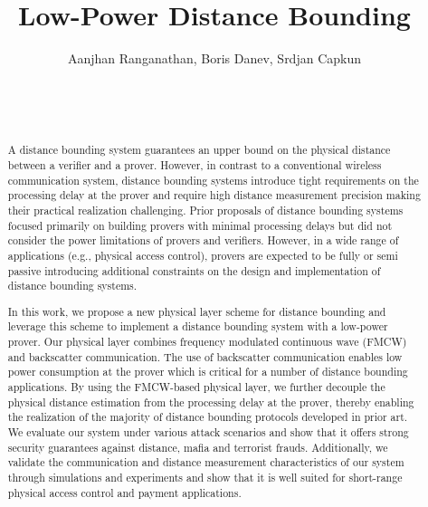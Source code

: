\documentclass{sig-alternate-10pt}
\begin{document}
\title{\Large \bf Low-Power Distance Bounding}
\date{}
\author{\alignauthor Aanjhan Ranganathan, Boris Danev, Srdjan Capkun\\
  \\
  \\
  \\
}

\maketitle

\begin{abstract}

  A distance bounding system guarantees an upper bound on the physical distance
  between a verifier and a prover. However, in contrast to a conventional
  wireless communication system, distance bounding systems introduce tight
  requirements on the processing delay at the prover and require high distance
  measurement precision making their practical realization challenging. Prior
  proposals of distance bounding systems focused primarily on building provers
  with minimal processing delays but did not consider the power limitations of
  provers and verifiers. However, in a wide range of applications (e.g.,
  physical access control), provers are expected to be fully or semi passive
  introducing additional constraints on the design and implementation of
  distance bounding systems.

  In this work, we propose a new physical layer scheme for distance bounding and
  leverage this scheme to implement a distance bounding system with a low-power
  prover. Our physical layer combines frequency modulated continuous wave (FMCW)
  and backscatter communication. The use of backscatter communication enables
  low power consumption at the prover which is critical for a number of distance
  bounding applications. By using the FMCW-based physical layer, we further
  decouple the physical distance estimation from the processing delay at the
  prover, thereby enabling the realization of the majority of distance bounding
  protocols developed in prior art. We evaluate our system under various attack
  scenarios and show that it offers strong security guarantees against distance,
  mafia and terrorist frauds. Additionally, we validate the communication and
  distance measurement characteristics of our system through simulations and
  experiments and show that it is well suited for short-range physical access
  control and payment applications.
\end{abstract}
\end{document}
